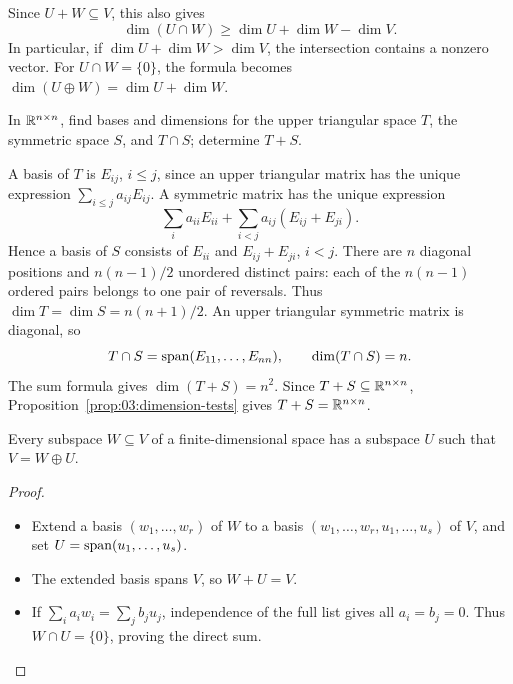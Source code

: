Since \(U+W\subseteq V\), this also gives
\[
\dim(U\cap W)\geqslant \dim U+\dim W-\dim V.
\]
In particular, if \(\dim U+\dim W>\dim V\), the intersection contains a
nonzero vector. For \(U\cap W=\{0\}\), the formula becomes
\(\dim(U\oplus W)=\dim U+\dim W\).

\begin{example}\label{example:03:matrix-spaces}
In \(\mathbb R^{n\times n}\), find bases and dimensions for the upper triangular
space \(T\), the symmetric space \(S\), and \(T\cap S\); determine \(T+S\).

A basis of \(T\) is \(E_{ij}\), \(i\leqslant j\), since an upper
triangular matrix has the unique expression \(\sum_{i\leqslant j}a_{ij}E_{ij}\).
A symmetric matrix has the unique expression
\[
\sum_i a_{ii}E_{ii}+\sum_{i<j}a_{ij}(E_{ij}+E_{ji}).
\]
Hence a basis of \(S\) consists of \(E_{ii}\) and \(E_{ij}+E_{ji}\), \(i<j\).
There are \(n\) diagonal positions and \(n(n-1)/2\) unordered distinct
pairs: each of the \(n(n-1)\) ordered pairs belongs to one pair of reversals.
Thus \(\dim T=\dim S=n(n+1)/2\).
An upper triangular symmetric matrix is diagonal, so
\[
T\cap S=\operatorname{span}(E_{11},\ldots,E_{nn}),\qquad \dim(T\cap S)=n.
\]
The sum formula gives \(\dim(T+S)=n^2\). Since \(T+S\subseteq\mathbb R^{n\times n}\),
Proposition~\ref{prop:03:dimension-tests} gives \(T+S=\mathbb R^{n\times n}\).
\end{example}

\begin{proposition}[Complements]\label{prop:03:complement}
Every subspace \(W\subseteq V\) of a finite-dimensional space has a
subspace \(U\) such that \(V=W\oplus U\).
\end{proposition}
\begin{proof}
\begin{itemize}
\item Extend a basis \((w_1,\ldots,w_r)\) of \(W\) to a basis
\((w_1,\ldots,w_r,u_1,\ldots,u_s)\) of \(V\), and set
\(U=\operatorname{span}(u_1,\ldots,u_s)\).
\item The extended basis spans \(V\), so \(W+U=V\).
\item If \(\sum_i a_iw_i=\sum_j b_ju_j\), independence of the full list gives
all \(a_i=b_j=0\). Thus \(W\cap U=\{0\}\), proving the direct sum.
\end{itemize}
\end{proof}

